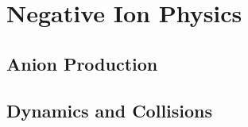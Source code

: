 %
	\section{Negative Ion Physics}
%
    \subsection{Anion Production}
%
    \subsection{Dynamics and Collisions}
%
